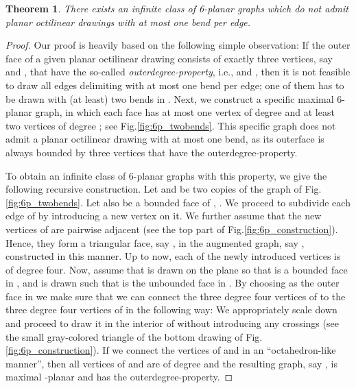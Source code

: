 \documentclass[a4paper,twoside,11pt]{article}
\newtheorem{theorem}{Theorem}
\begin{document}
\begin{theorem}
There exists an infinite class of 6-planar graphs which do not admit
planar octilinear drawings with at most one bend per edge.
\label{thm:6planar}
\end{theorem}
\begin{proof}
Our proof is heavily based on the following simple observation: If
the outer face  of a given planar octilinear
drawing  consists of exactly three vertices, say 
and , that have the so-called \emph{outerdegree-property},
i.e.,  and , then it
is not feasible to draw all edges delimiting
 with at most one bend per edge; one of them 
has to be drawn with (at least) two bends in . Next, we
construct a specific maximal 6-planar graph, in which each face has
at most one vertex of degree  and at least two vertices of degree
; see Fig.\ref{fig:6p_twobends}. This specific graph does not
admit a planar octilinear drawing with at most one bend, as its
outerface is always bounded by three vertices that have the
outerdegree-property.

To obtain an infinite class of 6-planar graphs with this property,
we give the following recursive construction. Let  and  be
two copies of the graph of Fig.\ref{fig:6p_twobends}. Let also 
be a bounded face of , . We proceed to subdivide each
edge of  by introducing a new vertex on it. We further assume
that the new vertices of  are pairwise adjacent (see the top
part of Fig.\ref{fig:6p_construction}). Hence, they form a
triangular face, say , in the augmented graph, say
, constructed in this manner. Up to now, each of the
newly introduced vertices is of degree four. Now, assume that
 is drawn on the plane so that  is a bounded face
in , and  is drawn such that  is
the unbounded face in . By choosing  as the
outer face in  we make sure that we can connect
the three degree four vertices of  to the three degree four
vertices of  in the following way: We appropriately scale down
 and proceed to draw it in the interior of 
without introducing any crossings (see the small gray-colored
triangle of the bottom drawing of Fig.\ref{fig:6p_construction}). If
we connect the vertices of  and  in an ``octahedron-like
manner'', then all vertices of  and  are of degree 
and the resulting graph, say , is
maximal -planar and has the outerdegree-property.
\end{proof}
\end{document}
